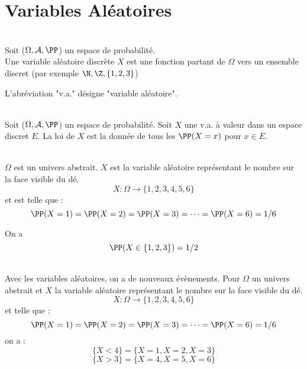 \documentclass[12pt,fleqn]{report} %
\begin{document}
\section{Variables Aléatoires}

\begin{definition}\text{ }\\
	Soit ($\Omega,\mathcal{A},\PP$) un espace de probabilité. \\Une variable aléatoire discrète $X$ est une fonction partant de $\Omega$ vers un ensemble discret (par exemple $\N,\Z,\lbrace 1,2,3 \rbrace$) 
\end{definition}
\begin{remark}
	L'abréviation "v.a." désigne "variable aléatoire".
\end{remark}
\begin{definition}\text{ }\\
	Soit ($\Omega,\mathcal{A},\PP$) un espace de probabilité. Soit $X$ une v.a. à valeur dans un espace discret $E$. La loi de $X$ est la donnée de tous les $\PP(X = x)$ pour $x \in E$. 
	
\end{definition}

\begin{example}\text{ }\\
	$\Omega$ est un univers abstrait. $X$ est la variable aléatoire représentant le nombre sur la face visible du dé.
	\[
	X : \Omega \to \lbrace 1,2,3,4,5,6 \rbrace
	\] et est telle que : 
	\[
	\PP(X=1) = \PP( X = 2) = \PP(X  = 3) = \dots = \PP(X = 6) = 1/6
	\]
	
	On a \[
	\PP(X \in \lbrace 1,2,3 \rbrace) = 1/2
	\]
\end{example}
\begin{example}\text{ }\\
	Avec les variables aléatoires, on a de nouveaux évènements. Pour $\Omega$ un univers abstrait et $X$ la variable aléatoire représentant le nombre sur la face visible du dé.
	\[
	X : \Omega \to \lbrace 1,2,3,4,5,6 \rbrace
	\] et telle que : 
	\[
	\PP(X=1) = \PP( X = 2) = \PP(X  = 3) = \dots = \PP(X = 6) = 1/6
	\] on a :
	\[
	\lbrace X < 4 \rbrace = \lbrace X = 1,X = 2,X = 3 \rbrace
	\]
	\[
	\lbrace X > 3 \rbrace = \lbrace X = 4, X = 5, X = 6 \rbrace
	\]
\end{example}
\end{document}
